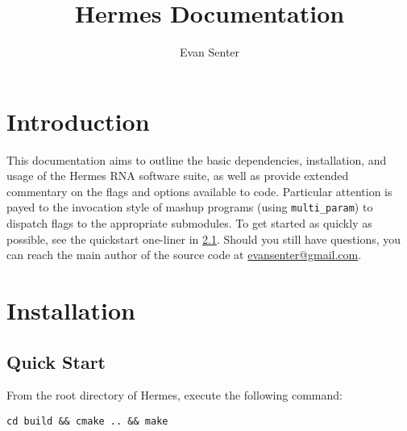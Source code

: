 \documentclass[11pt]{article}
\begin{document}
\newcommand{
\sectionLabel}[2] {
\section{#1} \label{sec:#2} }
\newcommand{
\subsectionLabel}[2] {
\subsection{#1} \label{sub:#2} }
\newcommand{\fixedWidthInList}[4] {
\item[\texttt{#1} \textnormal{#2} \url{#3}] \hfill \\
#4 }
\newcommand{\optionListItem}[2] {\item[\optionFlag{#1}] #2}
\newcommand{\optionFlag}[1] {\ttt{-#1/-\MakeUppercase{#1}}}
\newcommand{\ttt}[1]{{\tt #1}\xspace}
\newcommand{\hermes}{\ttt{hermes}}
\newcommand{\multiParam}{\ttt{multi\_param}}
\newcommand{\fft}{\ttt{FFTbor2D}}
\newcommand{\rnamfpt}{\ttt{RNAmfpt}}
\newcommand{\rnaeq}{\ttt{RNAeq}}
\newcommand{\fftmfpt}{\ttt{FFTmfpt}}
\newcommand{\ffteq}{\ttt{FFTeq}}
\newcommand{\rateeq}{\ttt{RateEq}}
\newcommand{\s}{$s$\xspace}
\newcommand{\A}{$A$\xspace}
\newcommand{\B}{$B$\xspace}
\newcommand{\req}{{\em requried}}

\title{Hermes Documentation}
\author{Evan Senter}

\maketitle
\tableofcontents \clearpage

\sectionLabel{Introduction}{intro}

This documentation aims to outline the basic dependencies, installation, and usage of the Hermes RNA software suite, as well as provide extended commentary on the flags and options available to code. Particular attention is payed to the invocation style of mashup programs (using \multiParam) to dispatch flags to the appropriate submodules. To get started as quickly as possible, see the quickstart one-liner in \ref{sub:quickstart}. Should you still have questions, you can reach the main author of the source code at \href{mailto:evansenter@gmail.com}{evansenter@gmail.com}.

\sectionLabel{Installation}{install}

\subsectionLabel{Quick Start}{quickstart}

From the root directory of Hermes, execute the following command:

{\tt cd build \&\& cmake .. \&\& make}
\end{document}
